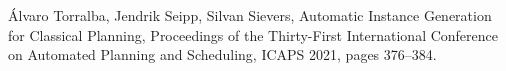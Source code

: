 \documentclass{article}
\begin{document}
                

        \newpage
            \begin{thebibliography}{1}
                 {\'{A}}lvaro Torralba, Jendrik Seipp, Silvan Sievers, Automatic Instance Generation for Classical Planning, Proceedings of the Thirty-First International Conference on Automated
               Planning and Scheduling, ICAPS 2021, pages 376--384.
            \end{thebibliography}
        
\end{document}
